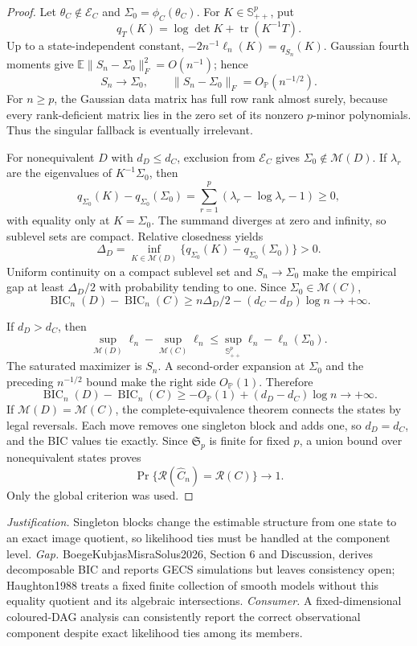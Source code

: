 \documentclass{article}
\begin{document}
\begin{proof}
Let \(\theta_C\notin\mathcal E_C\) and \(\Sigma_0=\phi_C(\theta_C)\).  For \(K\in\mathbb S^p_{++}\), put
\[
 q_T(K)=\log\det K+\operatorname{tr}(K^{-1}T).
\]
Up to a state-independent constant, \(-2n^{-1}\ell_n(K)=q_{S_n}(K)\).  Gaussian fourth moments give \(\mathbb E\|S_n-\Sigma_0\|_F^2=O(n^{-1})\); hence
\[
 S_n\to\Sigma_0,\qquad \|S_n-\Sigma_0\|_F=O_{\mathbb P}(n^{-1/2}).
\]
For \(n\ge p\), the Gaussian data matrix has full row rank almost surely, because every rank-deficient matrix lies in the zero set of its nonzero \(p\)-minor polynomials.  Thus the singular fallback is eventually irrelevant.

For nonequivalent \(D\) with \(d_D\le d_C\), exclusion from \(\mathcal E_C\) gives \(\Sigma_0\notin\mathcal M(D)\).  If \(\lambda_r\) are the eigenvalues of \(K^{-1}\Sigma_0\), then
\[
 q_{\Sigma_0}(K)-q_{\Sigma_0}(\Sigma_0)
 =\sum_{r=1}^p(\lambda_r-\log\lambda_r-1)\ge0,
\]
with equality only at \(K=\Sigma_0\).  The summand diverges at zero and infinity, so sublevel sets are compact.  Relative closedness yields
\[
 \Delta_D=\inf_{K\in\mathcal M(D)}
 \{q_{\Sigma_0}(K)-q_{\Sigma_0}(\Sigma_0)\}>0.
\]
Uniform continuity on a compact sublevel set and \(S_n\to\Sigma_0\) make the empirical gap at least \(\Delta_D/2\) with probability tending to one.  Since \(\Sigma_0\in\mathcal M(C)\),
\[
 \operatorname{BIC}_n(D)-\operatorname{BIC}_n(C)
 \ge n\Delta_D/2-(d_C-d_D)\log n\to+\infty.
\]

If \(d_D>d_C\), then
\[
 \sup_{\mathcal M(D)}\ell_n-\sup_{\mathcal M(C)}\ell_n
 \le\sup_{\mathbb S^p_{++}}\ell_n-\ell_n(\Sigma_0).
\]
The saturated maximizer is \(S_n\).  A second-order expansion at \(\Sigma_0\) and the preceding \(n^{-1/2}\) bound make the right side \(O_{\mathbb P}(1)\).  Therefore
\[
 \operatorname{BIC}_n(D)-\operatorname{BIC}_n(C)
 \ge-O_{\mathbb P}(1)+(d_D-d_C)\log n\to+\infty.
\]
If \(\mathcal M(D)=\mathcal M(C)\), the complete-equivalence theorem connects the states by legal reversals.  Each move removes one singleton block and adds one, so \(d_D=d_C\), and the BIC values tie exactly.  Since \(\mathfrak S_p\) is finite for fixed \(p\), a union bound over nonequivalent states proves
\[
 \Pr\{\mathcal R(\widehat C_n)=\mathcal R(C)\}\longrightarrow1.
\]
Only the global criterion was used.
\end{proof}
\par\smallskip\noindent \textit{Justification.} Singleton blocks change the estimable structure from one state to an exact image quotient, so likelihood ties must be handled at the component level. \textit{Gap.} BoegeKubjasMisraSolus2026, Section 6 and Discussion, derives decomposable BIC and reports GECS simulations but leaves consistency open; Haughton1988 treats a fixed finite collection of smooth models without this equality quotient and its algebraic intersections. \textit{Consumer.} A fixed-dimensional coloured-DAG analysis can consistently report the correct observational component despite exact likelihood ties among its members.
\end{document}
